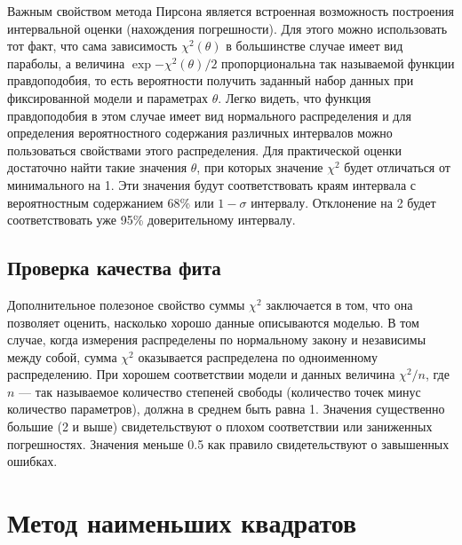 Важным свойством метода Пирсона является встроенная возможность построения
интервальной оценки (нахождения погрешности). Для этого можно использовать тот
факт, что сама зависимость $\chi^2(\theta)$ в большинстве случае имеет вид
параболы, а величина $\exp{- \chi^2(\theta)/2}$ пропорциональна так называемой
функции правдоподобия, то есть вероятности получить заданный набор данных при
фиксированной модели и параметрах $\theta$. Легко видеть, что функция
правдоподобия в этом случае имеет вид нормального распределения и для
определения вероятностного содержания различных интервалов можно пользоваться
свойствами этого распределения. Для практической оценки достаточно найти такие
значения $\theta$, при которых значение $\chi^2$ будет отличаться от
минимального на 1. Эти значения будут соответствовать краям интервала с
вероятностным содержанием 68\% или $1-\sigma$ интервалу. Отклонение на 2 будет
соответствовать уже 95\% доверительному интервалу.


\subsection{Проверка качества фита}

Дополнительное полезоное свойство суммы $\chi^2$ заключается в том,
что она позволяет оценить, насколько хорошо данные описываются моделью.
В том случае, когда измерения распределены по нормальному закону и
независимы между собой, сумма $\chi^2$ оказывается распределена по
%
одноименному распределению.
При хорошем соответствии модели и данных величина
$\chi^2 / n $, где $n$ --- так называемое количество степеней
свободы (количество точек минус количество параметров), должна в среднем
быть равна 1. Значения существенно большие (2 и выше) свидетельствуют о
плохом соответствии или заниженных погрешностях. Значения меньше 0.5 как
правило свидетельствуют о завышенных ошибках.

\section{Метод наименьших квадратов}

